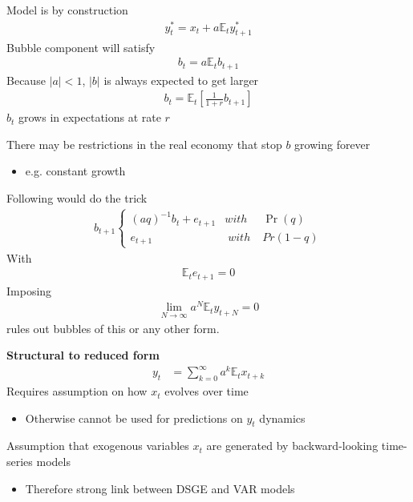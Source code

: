\documentclass{beamer}
\begin{document}
\begin{frame}
Model is by construction
\begin{align}
  y_t^* = x_t + a\mathbb{E}_t y^*_{t+1}
\end{align}
\medskip
Bubble component will satisfy
\begin{align}
  b_t = a\mathbb{E}_tb_{t+1} 
\end{align}
\medskip
  Because $|a|<1$, $|b|$ is always expected to get larger
  \begin{align}
    b_t=\mathbb{E}_t \left[\frac{1}{1+r} b_{t+1}\right]
  \end{align}
  \medskip
  $b_t$ grows in expectations at rate $r$   
\end{frame}

\begin{frame}
There may be restrictions in the real economy that stop $b$ growing forever
 \begin{itemize}
   \item e.g. constant growth
 \end{itemize}
\medskip
Following would do the trick
\begin{align}
  b_{t+1} \left\{\begin{matrix}
  (aq)^{-1}b_t + e_{t+1} &with\; &\Pr(q)
\\ e_{t+1} & \;with\;&Pr(1-q)
\end{matrix}\right.   
\end{align}
With 
\begin{align}
  \mathbb{E}_te_{t+1}=0
\end{align}
\medskip
Imposing 
\begin{align}
  \lim_{N \rightarrow \infty} a^N\mathbb{E}_ty_{t+N}=0
\end{align}
rules out bubbles of this or any other form.
\end{frame}

\begin{frame}
\textbf{Structural to reduced form}
  \begin{align}  y_t &= \sum^\infty_{k=0}a^k\mathbb{E}_tx_{t+k}  \end{align}
 Requires assumption on how $x_t$ evolves over time
\begin{itemize}
   \item Otherwise cannot be used for predictions on $y_t$ dynamics
\end{itemize}
\medskip
Assumption that exogenous variables $x_t$ are generated by backward-looking time-series models
\begin{itemize}
  \item Therefore strong link between DSGE and VAR models
\end{itemize}
\end{frame}
\end{document}
